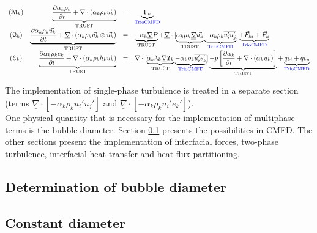 \begin{equation} \label{eq_6}
	\begin{array}{c r c l}
		(\mathcal{M}_k) 
		& \underbrace{\frac{\partial  \alpha_k \rho_k}{\partial t} + \nabla \cdot ({\alpha_k \rho_k} \vec{u_k})}_\text{TRUST}
		& =
		& \underbrace{\Gamma_k}_\text{\color{blue}TrioCMFD}
		\\
		(\mathcal{Q}_k) 
		& \underbrace{\frac{\partial \alpha_k \rho_k \vec{u_k}}{\partial t} + \underline{\nabla} \cdot ({\alpha_k \rho_k \vec{u_k}} \otimes \vec{u_k})}_\text{TRUST}
		& =
		& \underbrace{-\alpha_k \underline{\nabla} P}_\text{TRUST} +
		\underline{\nabla} \cdot [ \underbrace{\alpha_k \mu_k \underline{\underline{\nabla}} \vec{u_k}}_\text{TRUST} \underbrace{- \alpha_k\rho_k \overline{u_i'u_j'}}_\text{\color{blue}TrioCMFD}]
		\underbrace{+ \vec{F}_{ki}
		+ \vec{F}_k}_\text{\color{blue}TrioCMFD}
		\\
		(\mathcal{E}_k) 
		& \underbrace{\frac{\partial \alpha_k \rho_k e_k}{\partial t} + \nabla \cdot ({\alpha_k \rho_k h_k} \vec{u_k})}_\text{TRUST}
		& =
		& \nabla \cdot [ \underbrace{\alpha_k\lambda_k \underline{\nabla} T_k}_\text{TRUST}  \underbrace{- \alpha_k\rho_k \overline{u_i'e_k'}}_\text{\color{blue}TrioCMFD} ] 
		\underbrace{-p \left[\frac{\partial \alpha_k}{\partial t} + \nabla \cdot (\alpha_k u_k)\right]}_\text{TRUST} +
		\underbrace{q_{ki} +
		q_{kp}}_\text{\color{blue}TrioCMFD}
		
	\end{array}
\end{equation}

The implementation of single-phase turbulence is treated in a separate section (terms $\underline{\nabla} \cdot [ - \alpha_k\rho_k \overline{u_i'u_j'}]$ and  $\underline{\nabla} \cdot [ - \alpha_k\rho_k \overline{u_i'e_k'}]$). \\

One physical quantity that is necessary for the implementation of multiphase terms is the bubble diameter. Section \ref{seq_diameter} presents the possibilities in CMFD. The other sections present the implementation of interfacial forces, two-phase turbulence,  interfacial heat transfer and heat flux partitioning.

\subsection{Determination of bubble diameter}
\label{seq_diameter}

\subsection{Constant diameter}

